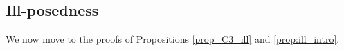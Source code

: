 \documentclass[%
11pt,  reqno]{amsart}
\newcommand{\5}{\textup{V}}
\newcommand{\FL}{\mathcal{F} L}
\newcommand{\F}{\mathcal{F}}
\newtheorem{proposition}[theorem]{Proposition}
\theoremstyle{remark}
\newcommand{\R}{\mathbb{R}}
\numberwithin{equation}{section}
\numberwithin{theorem}{section}
\begin{document}
\subsection{Ill-posedness} We now move to the proofs of Propositions \ref{prop_C3_ill} and \ref{prop:ill_intro}. 





\end{document}
